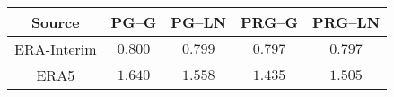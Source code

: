 \newlength{\templen}
\setlength\templen{\tabcolsep}
\setlength\tabcolsep{4pt}
\begin{tabular}{c|cccc}
\toprule
Source & PG--G & PG--LN & PRG--G & PRG--LN\\
\midrule
ERA-Interim & $0.800$ & $0.799$ & $\bm{0.797}$ & $0.797$\\
ERA5 & $1.640$ & $1.558$ & $\bm{1.435}$ & $1.505$\\
\bottomrule
\end{tabular}
\setlength\tabcolsep{\templen}